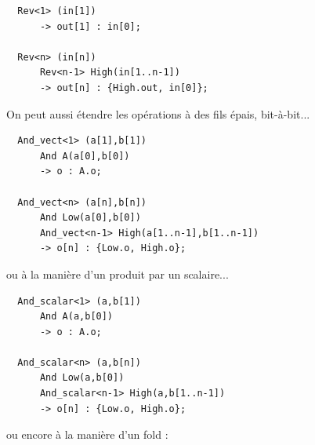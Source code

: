 \documentclass[13pt]{article}
\begin{document}
\begin{verbatim}
  Rev<1> (in[1])
      -> out[1] : in[0];

  Rev<n> (in[n])
      Rev<n-1> High(in[1..n-1])
      -> out[n] : {High.out, in[0]};
\end{verbatim}

On peut aussi étendre les opérations à des fils épais, bit-à-bit...

\begin{verbatim}
  And_vect<1> (a[1],b[1])
      And A(a[0],b[0])
      -> o : A.o;

  And_vect<n> (a[n],b[n])
      And Low(a[0],b[0])
      And_vect<n-1> High(a[1..n-1],b[1..n-1])
      -> o[n] : {Low.o, High.o};
\end{verbatim}

ou à la manière d'un produit par un scalaire...

\begin{verbatim}
  And_scalar<1> (a,b[1])
      And A(a,b[0])
      -> o : A.o;

  And_scalar<n> (a,b[n])
      And Low(a,b[0])
      And_scalar<n-1> High(a,b[1..n-1])
      -> o[n] : {Low.o, High.o};
\end{verbatim}

ou encore à la manière d'un fold :
\end{document}
